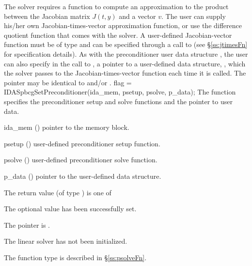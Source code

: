 {The 
{\idaspbcg} solver requires a function to compute an approximation to the
product between the Jacobian matrix $J(t,y)$ and a vector $v$.
The user can supply his/her own Jacobian-times-vector approximation function, 
or use the difference quotient function  
that comes with the {\idaspbcg} solver.
A user-defined Jacobian-vector function must be of type 
and can be specified through a call to  
(see \S\ref{ss:jtimesFn} for specification details).
As with the preconditioner user data structure , 
the user can also specify in the call to , a pointer
to a user-defined data structure, , which
the {\idaspbcg} solver passes to the Jacobian-times-vector function 
each time it is called.  
The pointer  may be identical to  and/or .
{
  flag = IDASpbcgSetPreconditioner(ida\_mem, psetup, psolve, p\_data);
}
{
  The function  specifies the preconditioner
  setup and solve functions and the pointer to user data.
}
{
  \begin{args}
  \item[ida\_mem] ()
    pointer to the {\ida} memory block.
  \item[psetup] ()
    user-defined preconditioner setup function.
  \item[psolve] ()
    user-defined preconditioner solve function.
  \item[p\_data] ()
     pointer to the user-defined data structure.
  \end{args}
}
{
  The return value  (of type ) is one of
  \begin{args}
  \item[\Id{IDASPBCG\_SUCCESS}] 
    The optional value has been successfully set.
  \item[\Id{IDASPBCG\_MEM\_NULL}]
    The  pointer is .
  \item[\Id{IDASPBCG\_LMEM\_NULL}]
    The {\idaspbcg} linear solver has not been initialized.
  \end{args}
}
{
   The function type  is described in \S\ref{ss:psolveFn}.
}}
